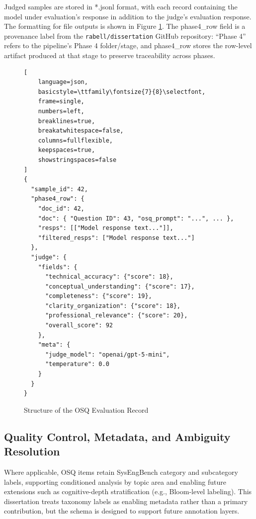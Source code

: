 Judged samples are stored in *.jsonl format, with each record containing the model under evaluation's response in addition to the judge's evaluation response. The formatting for file outputs is shown in Figure \ref{lst:osq-eval-json}. The phase4\_row field is a provenance label from the \texttt{rabell/dissertation} GitHub repository: “Phase 4” refers to the pipeline’s Phase 4 folder/stage, and phase4\_row stores the row-level artifact produced at that stage to preserve traceability across phases.


\begin{figure}[htbp]
\centering
\begin{scriptsize}
\begin{lstlisting}[
    language=json,
    basicstyle=\ttfamily\fontsize{7}{8}\selectfont,
    frame=single,
    numbers=left,
    breaklines=true,
    breakatwhitespace=false,
    columns=fullflexible,
    keepspaces=true,
    showstringspaces=false
]
{
  "sample_id": 42,
  "phase4_row": {
    "doc_id": 42,
    "doc": { "Question ID": 43, "osq_prompt": "...", ... },
    "resps": [["Model response text..."]],
    "filtered_resps": ["Model response text..."]
  },
  "judge": {
    "fields": {
      "technical_accuracy": {"score": 18},
      "conceptual_understanding": {"score": 17},
      "completeness": {"score": 19},
      "clarity_organization": {"score": 18},
      "professional_relevance": {"score": 20},
      "overall_score": 92
    },
    "meta": {
      "judge_model": "openai/gpt-5-mini",
      "temperature": 0.0
    }
  }
}
\end{lstlisting}
\end{scriptsize}
\caption{Structure of the OSQ Evaluation Record}
\label{lst:osq-eval-json}
\end{figure}
\clearpage






\subsection{Quality Control, Metadata, and Ambiguity Resolution}
\label{subsec:ch3_obj2_qc}

Where applicable, OSQ items retain SysEngBench category and subcategory labels, supporting conditioned analysis by topic area and enabling future extensions such as cognitive-depth stratification (e.g., Bloom-level labeling). This dissertation treats taxonomy labels as enabling metadata rather than a primary contribution, but the schema is designed to support future annotation layers.

